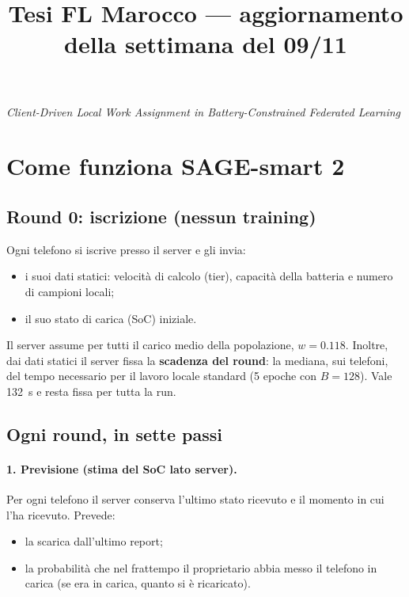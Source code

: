 \documentclass[11pt,a4paper]{article}
\title{\bfseries Tesi FL Marocco --- aggiornamento della settimana del 09/11}
\author{}
\date{}
\begin{document}
\maketitle
\vspace{-3.2em}
\begin{center}
\emph{Client-Driven Local Work Assignment in Battery-Constrained Federated Learning}
\end{center}
\vspace{1em}

\section{Come funziona SAGE-smart 2}
\label{sec:protocol}

\subsection{Round 0: iscrizione (nessun training)}

Ogni telefono si iscrive presso il server e gli invia:
\begin{itemize}
  \item i suoi dati statici: velocità di calcolo (tier), capacità della
        batteria e numero di campioni locali;
  \item il suo stato di carica (SoC) iniziale.
\end{itemize}
Il server
assume per tutti il carico medio della popolazione, $w = 0.118$. Inoltre, dai dati statici il server fissa la \textbf{scadenza del round}: la mediana,
sui telefoni, del tempo necessario per il lavoro locale standard (5 epoche con
$B = 128$). Vale \SI{132}{s} e resta fissa per tutta la run.

\subsection{Ogni round, in sette passi}

\paragraph{1. Previsione (stima del SoC lato server).}
Per ogni telefono il server conserva l'ultimo stato ricevuto e il momento in
cui l'ha ricevuto. Prevede:
\begin{itemize}
  \item la scarica dall'ultimo report;
  \item la probabilità che nel frattempo il proprietario abbia messo il telefono in carica (se era in carica, quanto si è ricaricato).
\end{itemize}
\end{document}
